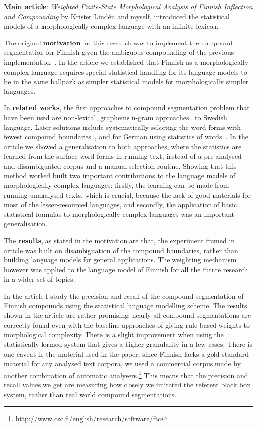 \documentclass[officiallayout]{unihelcompling}
\begin{document}
\textbf{Main article}: \emph{Weighted Finite-State Morphological Analysis of
Finnish Inflection and Compounding}  by Krister
Lindén and myself, introduced the statistical models of a morphologically
complex language with an infinite lexicon.

The original \textbf{motivation} for this research was to implement the
compound segmentation for Finnish given the ambiguous compounding of the
previous implementation~\citep{pirinen2008suomen}. In the article we
established that Finnish as a morphologically complex language requires special
statistical handling for its language models to be in the same ballpark as
simpler statistical models for morphologically simpler languages.

In \textbf{related works}, the first approaches to compound segmentation
problem that have been used are non-lexical, grapheme n-gram
approaches~\citep{kokkinakis2008semantically} to Swedish language. Later
solutions include systematically selecting the word forms with fewest compound
boundaries~\citep{karlsson1992swetwol}, and for German using statistics of
words~\citep{schiller2006german}. In the article we showed a generalisation to
both approaches, where the statistics are learned from the surface word forms
in running text, instead of a pre-analysed and disambiguated corpus and a
manual selection routine.  Showing that this method worked built two important
contributions to the language models of morphologically complex languages:
firstly, the learning can be made from running unanalysed texts, which is
crucial, because the lack of good materials for most of the lesser-resourced
languages, and secondly, the application of basic statistical formulas to
morphologically complex languages was an important generalisation.

The \textbf{results}, as stated in the motivation are that, the experiment
framed in article was built on disambiguation of the compound boundaries,
rather than building language models for general applications. The weighting
mechanism however was applied to the language model of Finnish for all the
future research in a wider set of topics.

In the article I study the precision and recall of the compound segmentation of
Finnish compounds using the statistical language modelling scheme. The results
shown in the article are rather promising; nearly all compound segmentations
are correctly found even with the baseline approaches of giving rule-based
weights to morphological complexity. There is a slight improvement when using
the statistically formed system that gives a higher granularity in a few cases.
There is one caveat in the material used in the paper, since Finnish lacks a
gold standard material for any analysed text corpora, we used a commercial
corpus made by another combination of automatic
analysers.\footnote{\url{http://www.csc.fi/english/research/software/ftc}} This
means that the precision and recall values we get are measuring how closely we
imitated the referent black box system, rather than real world compound
segmentations.
\end{document}
